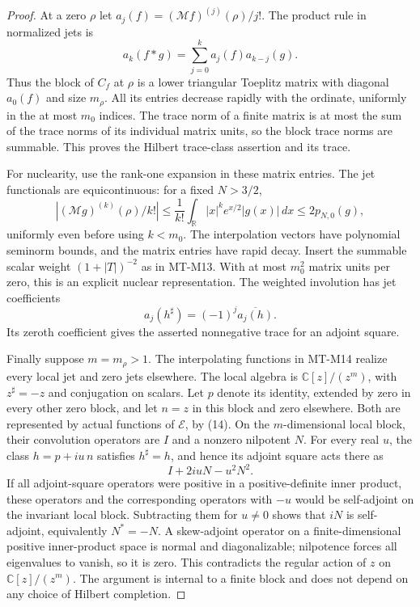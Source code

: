 \documentclass[11pt,a4paper]{article}
\begin{document}
\begin{proof}
At a zero $\rho$ let $a_j(f)=(\mathcal Mf)^{(j)}(\rho)/j!$.
The product rule in normalized jets is
\[
       a_k(f*g)=\sum_{j=0}^k a_j(f)a_{k-j}(g).
\]
Thus the block of $C_f$ at $\rho$ is a lower triangular
Toeplitz matrix with diagonal $a_0(f)$ and size $m_\rho$.
All its entries decrease rapidly with the ordinate,
uniformly in the at most $m_0$ indices.
The trace norm of a finite matrix is at most the sum
of the trace norms of its individual matrix units,
so the block trace norms are summable. This proves
the Hilbert trace-class assertion and its trace.

For nuclearity, use the rank-one expansion in these
matrix entries. The jet functionals are equicontinuous:
for a fixed $N>3/2$,
\[
 |(\mathcal Mg)^{(k)}(\rho)/k!|
 \le \frac1{k!}\int_{\mathbb R}|x|^k e^{x/2}|g(x)|\,dx
 \le2p_{N,0}(g),
\]
uniformly even before using $k<m_0$.
The interpolation vectors have polynomial seminorm
bounds, and the matrix entries have rapid decay.
Insert the summable scalar weight $(1+|T|)^{-2}$
as in MT-M13. With at most $m_0^2$ matrix units per
zero, this is an explicit nuclear representation.
The weighted involution has jet coefficients
\[
                   a_j(h^\sharp)=(-1)^j\overline{a_j(h)}.
\]
Its zeroth coefficient gives the asserted nonnegative
trace for an adjoint square.

Finally suppose $m=m_\rho>1$. The interpolating functions
in MT-M14 realize every local jet and zero jets elsewhere.
The local algebra is $\mathbb C[z]/(z^m)$, with
$z^\sharp=-z$ and conjugation on scalars.
Let $p$ denote its identity, extended by zero in every
other zero block, and let $n=z$ in this block and zero
elsewhere. Both are represented by actual functions
of $\mathcal E$, by (14). On the $m$-dimensional local
block, their convolution operators are $I$ and a
nonzero nilpotent $N$.
For every real $u$, the class $h=p+iu\,n$ satisfies
$h^\sharp=h$, and hence its adjoint square acts there as
\[
                         I+2iuN-u^2N^2.
\]
If all adjoint-square operators were positive in a
positive-definite inner product, these operators and
the corresponding operators with $-u$ would be
self-adjoint on the invariant local block.
Subtracting them for $u\ne0$ shows that $iN$ is
self-adjoint, equivalently $N^*=-N$.
A skew-adjoint operator on a finite-dimensional positive
inner-product space is normal and diagonalizable;
nilpotence forces all eigenvalues to vanish, so it is
zero. This contradicts the regular action of $z$
on $\mathbb C[z]/(z^m)$.
The argument is internal to a finite block and
does not depend on any choice of Hilbert completion.
\end{proof}
\end{document}
